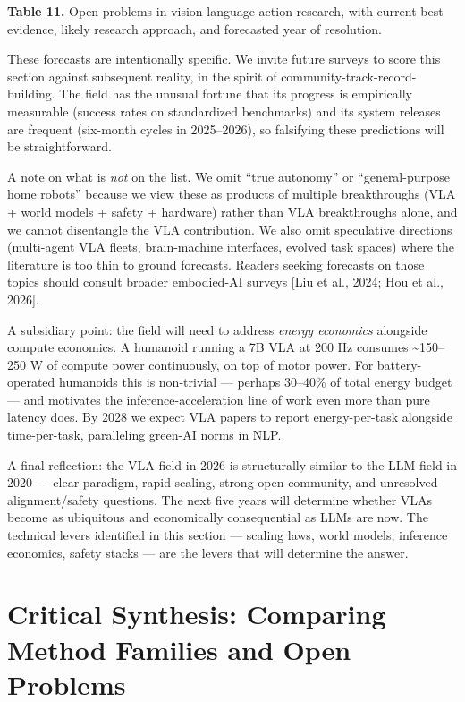 \textbf{Table 11.} Open problems in vision-language-action research, with current best evidence, likely research approach, and forecasted year of resolution.

These forecasts are intentionally specific. We invite future surveys to score this section against subsequent reality, in the spirit of community-track-record-building. The field has the unusual fortune that its progress is empirically measurable (success rates on standardized benchmarks) and its system releases are frequent (six-month cycles in 2025--2026), so falsifying these predictions will be straightforward.

A note on what is \emph{not} on the list. We omit ``true autonomy'' or ``general-purpose home robots'' because we view these as products of multiple breakthroughs (VLA + world models + safety + hardware) rather than VLA breakthroughs alone, and we cannot disentangle the VLA contribution. We also omit speculative directions (multi-agent VLA fleets, brain-machine interfaces, evolved task spaces) where the literature is too thin to ground forecasts. Readers seeking forecasts on those topics should consult broader embodied-AI surveys {[}Liu et al., 2024; Hou et al., 2026{]}.

A subsidiary point: the field will need to address \emph{energy economics} alongside compute economics. A humanoid running a 7B VLA at 200 Hz consumes \textasciitilde150--250 W of compute power continuously, on top of motor power. For battery-operated humanoids this is non-trivial --- perhaps 30--40\% of total energy budget --- and motivates the inference-acceleration line of work even more than pure latency does. By 2028 we expect VLA papers to report energy-per-task alongside time-per-task, paralleling green-AI norms in NLP.

A final reflection: the VLA field in 2026 is structurally similar to the LLM field in 2020 --- clear paradigm, rapid scaling, strong open community, and unresolved alignment/safety questions. The next five years will determine whether VLAs become as ubiquitous and economically consequential as LLMs are now. The technical levers identified in this section --- scaling laws, world models, inference economics, safety stacks --- are the levers that will determine the answer.

\section{Critical Synthesis: Comparing Method Families and Open Problems}\label{critical-synthesis-comparing-method-families-and-open-problems}

